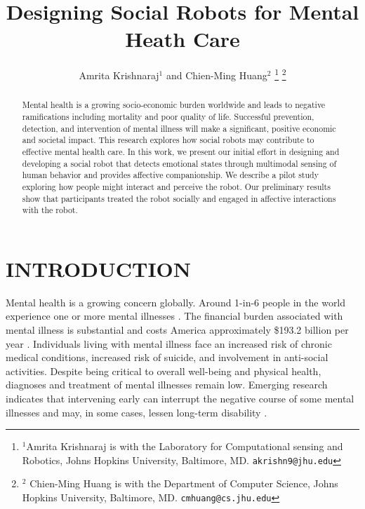 \documentclass[letterpaper, 10 pt, conference]{ieeeconf}  %
\title{\LARGE \bf
Designing Social Robots for Mental Heath Care
}
\author{Amrita Krishnaraj$^{1}$ and Chien-Ming Huang$^{2}$%
\thanks{$^{1}$Amrita Krishnaraj is with the Laboratory for Computational sensing and Robotics,
        Johns Hopkins University, Baltimore, MD.
        {\tt\small akrishn9@jhu.edu}}%
\thanks{$^{2}$ Chien-Ming Huang is with the Department of Computer Science, Johns Hopkins University, Baltimore, MD.
        {\tt\small cmhuang@cs.jhu.edu}}%
}
\begin{document}
\maketitle
\thispagestyle{empty}
\pagestyle{empty}


\begin{abstract}

Mental health is a growing socio-economic burden worldwide and leads to negative ramifications including mortality and poor quality of life. Successful prevention, detection, and intervention of mental illness will make a significant, positive economic and societal impact. This research explores how social robots may contribute to effective mental health care. In this work, we present our initial effort in designing and developing  a social robot that detects emotional states through multimodal sensing of human behavior and provides affective companionship. We describe a pilot study exploring how people might interact and perceive the robot. Our preliminary results show that participants treated the robot socially and engaged in affective interactions with the robot. 


\end{abstract}


\section{INTRODUCTION}

Mental health is a growing concern globally. Around 1-in-6 people in the world experience one or more mental illnesses \cite{r1}. The financial burden associated with mental illness is substantial and costs America approximately \$193.2 billion per year \cite{r3}. Individuals living with mental illness face an increased risk of chronic medical conditions, increased risk of suicide, and involvement in anti-social activities. Despite being critical to overall well-being and physical health, diagnoses and treatment of mental illnesses remain low. Emerging research indicates that intervening early can interrupt the negative course of some mental illnesses and may, in some cases, lessen long-term disability \cite{r2}. 
\end{document}
